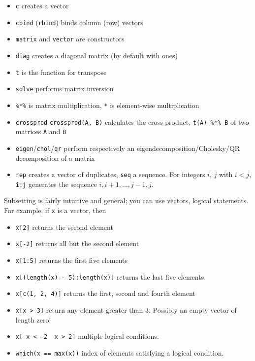 \documentclass[]{book}
\providecommand{\tightlist}{%
  \setlength{\itemsep}{0pt}\setlength{\parskip}{0pt}}
\begin{document}
\begin{itemize}
\tightlist
\item
  \texttt{c} creates a vector
\item
  \texttt{cbind} (\texttt{rbind}) binds column (row) vectors
\item
  \texttt{matrix} and \texttt{vector} are constructors
\item
  \texttt{diag} creates a diagonal matrix (by default with ones)
\item
  \texttt{t} is the function for transpose
\item
  \texttt{solve} performs matrix inversion
\item
  \texttt{\%*\%} is matrix multiplication, \texttt{*} is element-wise
  multiplication
\item
  \texttt{crossprod} \texttt{crossprod(A,\ B)} calculates the
  cross-product, \texttt{t(A)\ \%*\%\ B} of two matrices \texttt{A} and
  \texttt{B}
\item
  \texttt{eigen}/\texttt{chol}/\texttt{qr} perform respectively an
  eigendecomposition/Cholesky/QR decomposition of a matrix
\item
  \texttt{rep} creates a vector of duplicates, \texttt{seq} a sequence.
  For integers \(i\), \(j\) with \(i<j\), \texttt{i:j} generates the
  sequence \(i, i+1, \ldots, j-1, j\).
\end{itemize}

Subsetting is fairly intuitive and general; you can use vectors, logical
statements. For example, if \texttt{x} is a vector, then

\begin{itemize}
\tightlist
\item
  \texttt{x{[}2{]}} returns the second element
\item
  \texttt{x{[}-2{]}} returns all but the second element
\item
  \texttt{x{[}1:5{]}} returns the first five elements
\item
  \texttt{x{[}(length(x)\ -\ 5):length(x){]}} returns the last five
  elements
\item
  \texttt{x{[}c(1,\ 2,\ 4){]}} returns the first, second and fourth
  element
\item
  \texttt{x{[}x\ \textgreater{}\ 3{]}} return any element greater than
  3. Possibly an empty vector of length zero!
\item
  \texttt{x{[}\ x\ \textless{}\ -2\ \textbar{}\ x\ \textgreater{}\ 2{]}}
  multiple logical conditions.
\item
  \texttt{which(x\ ==\ max(x))} index of elements satisfying a logical
  condition.
\end{itemize}
\end{document}
